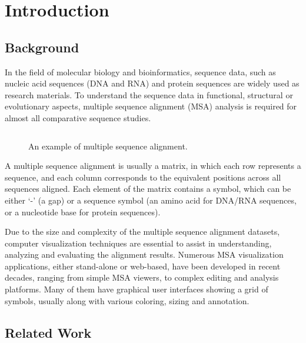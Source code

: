 \chapter{Introduction}\label{chap:Introduction}

\section{Background}

In the field of molecular biology and bioinformatics, sequence data, such as nucleic acid sequences (DNA and RNA) and protein sequences are widely used as research materials. To understand the sequence data in functional, structural or evolutionary aspects, multiple sequence alignment (MSA) analysis is required for almost all comparative sequence studies.

\begin{figure}[hb]
\begin{quote}\Tiny
\begin{verbatim}

\end{verbatim}
\end{quote}
\caption[Example of Multiple Sequence Alignment]{An example of multiple sequence alignment.}\label{fig:msa}
\end{figure}

A multiple sequence alignment is usually a matrix, in which each row represents a sequence, and each column corresponds to the equivalent positions across all sequences aligned. Each element of the matrix contains a symbol, which can be either `-' (a gap) or a sequence symbol (an amino acid for DNA/RNA sequences, or a nucleotide base for protein sequences). \cite{Edgar:2006aa}

Due to the size and complexity of the multiple sequence alignment datasets, computer visualization techniques are essential to assist in understanding, analyzing and evaluating the alignment results. Numerous MSA visualization applications, either stand-alone or web-based, have been developed in recent decades, ranging from simple MSA viewers, to complex editing and analysis platforms. Many of them have graphical user interfaces showing a grid of symbols, usually along with various coloring, sizing and annotation. \cite{Procter2010aa}

\section{Related Work}

